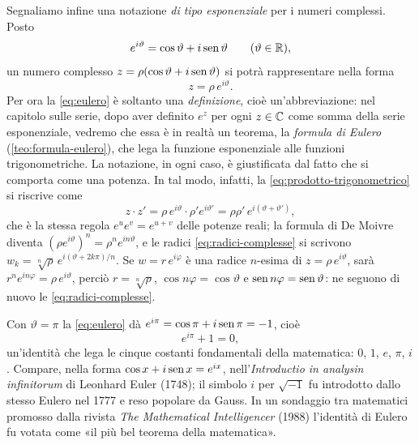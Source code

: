 Segnaliamo infine una notazione \emph{di tipo esponenziale} per i numeri complessi.
Posto
\begin{equation}\label{eq:eulero}
  e^{i\vartheta}=\cos\vartheta+i\operatorname{sen}\vartheta \qquad (\vartheta\in\mathbb{R}),
\end{equation}
un numero complesso $z=\rho(\cos\vartheta+i\operatorname{sen}\vartheta)$ si potrà rappresentare nella
forma
\begin{equation}\label{eq:forma-esponenziale}
  z=\rho\,e^{i\vartheta}.
\end{equation}
Per ora la \eqref{eq:eulero} è soltanto una \emph{definizione}, cioè un'abbreviazione:
nel capitolo sulle serie, dopo aver definito $e^{z}$ per ogni $z\in\mathbb{C}$ come somma della
serie esponenziale, vedremo che essa è in realtà un teorema, la \emph{formula di Eulero}
(\cref{teo:formula-eulero}), che lega la funzione esponenziale alle funzioni
trigonometriche. La notazione,
in ogni caso, è giustificata dal fatto che si comporta come una potenza. In tal modo,
infatti, la \eqref{eq:prodotto-trigonometrico} si riscrive come
\begin{equation}\label{eq:prodotto-esponenziale}
  z\cdot z'=\rho\,e^{i\vartheta}\cdot\rho'e^{i\vartheta'}=\rho\rho'\,e^{i(\vartheta+\vartheta')},
\end{equation}
che è la stessa regola $e^{u}e^{v}=e^{u+v}$ delle potenze reali; la formula di De Moivre
diventa $(\rho e^{i\vartheta})^{n}=\rho^{n}e^{in\vartheta}$, e le radici
\eqref{eq:radici-complesse} si scrivono
$w_{k}=\sqrt[n]\rho\,e^{i(\vartheta+2k\pi)/n}$. Se $w=r\,e^{i\varphi}$ è una radice
$n$-esima di $z=\rho\,e^{i\vartheta}$, sarà $r^{n}e^{in\varphi}=\rho\,e^{i\vartheta}$,
perciò $r=\sqrt[n]\rho$, $\cos n\varphi=\cos\vartheta$ e $\operatorname{sen} n\varphi=\operatorname{sen}\vartheta$:
ne seguono di nuovo le \eqref{eq:radici-complesse}.

\begin{notastorica}
Con $\vartheta=\pi$ la \eqref{eq:eulero} dà $e^{i\pi}=\cos\pi+i\operatorname{sen}\pi=-1$, cioè
\[
  e^{i\pi}+1=0,
\]
un'identità che lega le cinque costanti fondamentali della matematica: $0$, $1$, $e$,
$\pi$, $i$. Compare, nella forma $\cos x+i\operatorname{sen} x=e^{ix}$, nell'\emph{Introductio in
analysin infinitorum} di Leonhard Euler (1748); il simbolo $i$ per $\sqrt{-1}$ fu
introdotto dallo stesso Eulero nel 1777 e reso popolare da Gauss. In un sondaggio tra
matematici promosso dalla rivista \emph{The Mathematical Intelligencer} (1988) l'identità
di Eulero fu votata come «il più bel teorema della matematica».
\end{notastorica}

